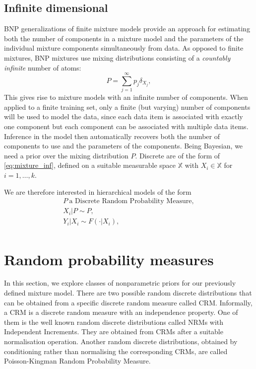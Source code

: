 \subsection{Infinite dimensional}
\acrlong{BNP} generalizations of finite mixture models provide an approach for estimating both the number of components in a mixture model and the parameters of the individual mixture components simultaneously from data. As opposed to finite mixtures, \gls{BNP} mixtures use mixing distributions consisting of a \textit{countably infinite} number of atoms:
\begin{equation} \label{eq:mixture_inf}
P = \sum_{j=1}^\infty p_j \delta_{X_j},
\end{equation}
This gives rise to mixture models with an infinite number of components. When applied to a finite training set, only a finite (but varying) number of components will be used to model the data, since each data item is associated with exactly one component but each component can be associated with multiple data items.
Inference in the model then automatically recovers both the number of components to use and the parameters of the components.
Being Bayesian, we need a prior over the mixing distribution $P$. %
Discrete  are of the form of \ref{eq:mixture_inf}, defined on a suitable measurable space $\mathbb{X}$ with $X_i \in \mathbb{X}$ for $i=1,\dots,k$.


We are therefore interested in hierarchical models of the form
\begin{gather*}
P \ \text{a Discrete Random Probability Measure}, \\
X_i|P \sim P, \\
Y_i|X_i \sim F(\cdot|X_i), \\
\end{gather*}


\section{Random probability measures}
In this section, we explore classes of nonparametric priors for our previously defined mixture model.
There are two possible random discrete distributions that can be obtained from a specific discrete random measure called \acrfull{CRM}. Informally, a \gls{CRM} is a discrete random measure with an independence property. One of them is the well known random discrete distributions called \acrlong{NRM}s with Independent Increments. They are obtained from \glspl{CRM} after a suitable normalisation operation. Another random discrete distributions, obtained by conditioning rather than normalising the corresponding \glspl{CRM}, are called Poisson-Kingman Random Probability Measure.

